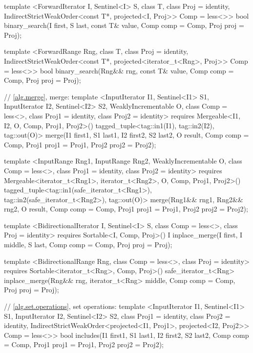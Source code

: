 \begin{codeblock}
{{{{  template <ForwardIterator I, Sentinel<I> S, class T, class Proj = identity,
      IndirectStrictWeakOrder<const T*, projected<I, Proj>> Comp = less<>>
    bool
      binary_search(I first, S last, const T& value, Comp comp = Comp{},
                    Proj proj = Proj{});

  template <ForwardRange Rng, class T, class Proj = identity,
      IndirectStrictWeakOrder<const T*, projected<iterator_t<Rng>, Proj>> Comp = less<>>
    bool
      binary_search(Rng&& rng, const T& value, Comp comp = Comp{},
                    Proj proj = Proj{});

  // \ref{alg.merge}, merge:
  template <InputIterator I1, Sentinel<I1> S1, InputIterator I2, Sentinel<I2> S2,
      WeaklyIncrementable O, class Comp = less<>, class Proj1 = identity,
      class Proj2 = identity>
    requires Mergeable<I1, I2, O, Comp, Proj1, Proj2>()
    tagged_tuple<tag::in1(I1), tag::in2(I2), tag::out(O)>
      merge(I1 first1, S1 last1, I2 first2, S2 last2, O result,
            Comp comp = Comp{}, Proj1 proj1 = Proj1{}, Proj2 proj2 = Proj2{});

  template <InputRange Rng1, InputRange Rng2, WeaklyIncrementable O, class Comp = less<>,
      class Proj1 = identity, class Proj2 = identity>
    requires Mergeable<iterator_t<Rng1>, iterator_t<Rng2>, O, Comp, Proj1, Proj2>()
    tagged_tuple<tag::in1(safe_iterator_t<Rng1>),
                 tag::in2(safe_iterator_t<Rng2>),
                 tag::out(O)>
      merge(Rng1&& rng1, Rng2&& rng2, O result,
            Comp comp = Comp{}, Proj1 proj1 = Proj1{}, Proj2 proj2 = Proj2{});

  template <BidirectionalIterator I, Sentinel<I> S, class Comp = less<>,
      class Proj = identity>
    requires Sortable<I, Comp, Proj>()
    I
      inplace_merge(I first, I middle, S last, Comp comp = Comp{}, Proj proj = Proj{});

  template <BidirectionalRange Rng, class Comp = less<>, class Proj = identity>
    requires Sortable<iterator_t<Rng>, Comp, Proj>()
    safe_iterator_t<Rng>
      inplace_merge(Rng&& rng, iterator_t<Rng> middle, Comp comp = Comp{},
                    Proj proj = Proj{});

  // \ref{alg.set.operations}, set operations:
  template <InputIterator I1, Sentinel<I1> S1, InputIterator I2, Sentinel<I2> S2,
      class Proj1 = identity, class Proj2 = identity,
      IndirectStrictWeakOrder<projected<I1, Proj1>, projected<I2, Proj2>> Comp = less<>>
    bool
      includes(I1 first1, S1 last1, I2 first2, S2 last2, Comp comp = Comp{},
               Proj1 proj1 = Proj1{}, Proj2 proj2 = Proj2{});

}}}}
\end{codeblock}
